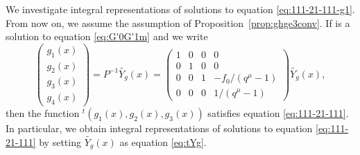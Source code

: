 \documentclass[pdftex]{sigma}
\numberwithin{equation}{section}
\theoremstyle{definition}
\begin{document}
We investigate integral representations of solutions to equation \eqref{eq:111-21-111-g1}.
From now on, we assume the assumption of Proposition~\ref{prop:ghge3conv}.
If  is a solution to equation \eqref{eq:G'0G'1m} and we write
\begin{equation*}
\begin{pmatrix}
 g_1(x) \\
 g_2(x) \\
 g_3(x) \\
 g_4(x)
\end{pmatrix}
= P^{-1} \widetilde{Y_g}(x)
=
\begin{pmatrix}
 1 & 0 & 0 & 0 \\
 0 & 1 & 0 & 0 \\
 0 & 0 & 1 & -f_0/(q^{\mu} -1) \\
 0 & 0 & 0 & 1/(q^{\mu} -1)
 \end{pmatrix} \widetilde{Y_g}(x) ,
\end{equation*}
then the function ${}^t(g_1 (x), g_2 (x), g_3 (x) ) $ satisfies equation \eqref{eq:111-21-111}.
In particular, we obtain integral representations of solutions to equation \eqref{eq:111-21-111} by setting $\widetilde{Y_g}(x) $ as equation \eqref{eq:tYg}.
\end{document}
